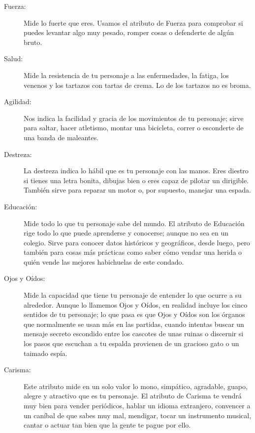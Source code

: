 \begin{description}
\item[Fuerza:]
Mide lo fuerte que eres. Usamos el atributo de Fuerza para comprobar si puedes levantar algo muy pesado, romper cosas o defenderte de algún bruto.

\item[Salud:]
Mide la resistencia de tu personaje a las enfermedades, la fatiga, los venenos y los tartazos con tartas de crema. Lo de los tartazos no es broma.

\item[Agilidad:]
Nos indica la facilidad y gracia de los movimientos de tu personaje; sirve para saltar, hacer atletismo, montar una bicicleta, correr o esconderte de una banda de maleantes.

\item[Destreza:]
La destreza indica lo hábil que es tu personaje con las manos. Eres diestro si tienes una letra bonita, dibujas bien o eres capaz de pilotar un dirigible. También sirve para reparar un motor o, por supuesto, manejar una espada.

\item[Educación:]
Mide todo lo que tu personaje sabe del mundo. El atributo de Educación rige todo lo que puede aprenderse y conocerse; aunque no sea en un colegio. Sirve para conocer datos históricos y geográficos, desde luego, pero también para cosas más prácticas como saber cómo vendar una herida o quién vende las mejores habichuelas de este condado.

\item[Ojos y Oídos:]
Mide la capacidad que tiene tu personaje de entender lo que ocurre a su alrededor. Aunque lo llamemos Ojos y Oídos, en realidad incluye los cinco sentidos de tu personaje; lo que pasa es que Ojos y Oídos son los órganos que normalmente se usan más en las partidas, cuando intentas buscar un mensaje secreto escondido entre los cascotes de unas ruinas o discernir si los pasos que escuchan a tu espalda provienen de un gracioso gato o un taimado espía.

\item[Carisma:]
Este atributo mide en un solo valor lo mono, simpático, agradable, guapo, alegre y atractivo que es tu personaje. El atributo de Carisma te vendrá muy bien para vender periódicos, hablar un idioma extranjero, convencer a un caníbal de que sabes muy mal, mendigar, tocar un instrumento musical, cantar o actuar tan bien que la gente te pague por ello.

\end{description}

